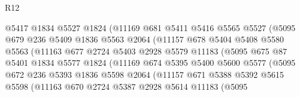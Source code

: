 \begin{lexlean}{R12}
\begin{coremodule}
                          @5417
                          @1834
                          @5527
                          @1824
                          (@11169
                            @681
                            @5411
                            @5416
                            @5565
                            @5527
                            (@5095
                              @679
                              @236
                              @5409
                              @1836
                              @5563
                              @2064
                              (@11157
                                @678
                                @5404
                                @5408
                                @5580
                                @5563
                                (@11163
                                  @677
                                  @2724
                                  @5403
                                  @2928
                                  @5579
                                  @11183
                                  (@5095
                                    @675
                                    @87
                                    @5401
                                    @1834
                                    @5577
                                    @1824
                                    (@11169
                                      @674
                                      @5395
                                      @5400
                                      @5600
                                      @5577
                                      (@5095
                                        @672
                                        @236
                                        @5393
                                        @1836
                                        @5598
                                        @2064
                                        (@11157
                                          @671
                                          @5388
                                          @5392
                                          @5615
                                          @5598
                                          (@11163
                                            @670
                                            @2724
                                            @5387
                                            @2928
                                            @5614
                                            @11183
                                            (@5095

\end{coremodule}
\end{lexlean}
